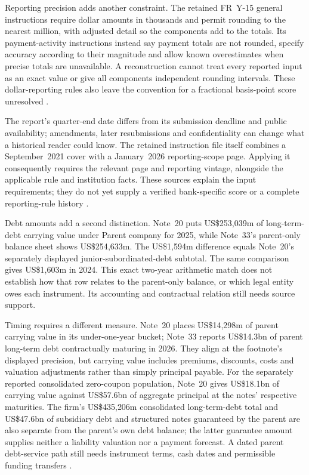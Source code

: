 Reporting precision adds another constraint. The retained FR~Y-15 general
instructions require dollar amounts in thousands and permit rounding to the
nearest million, with adjusted detail so the components add to the totals.
Its payment-activity instructions instead say payment totals are not rounded,
specify accuracy according to their magnitude and allow known overestimates
when precise totals are unavailable. A reconstruction cannot treat every
reported input as an exact value or give all components independent rounding
intervals. These dollar-reporting rules also leave the convention for a
fractional basis-point score unresolved
\citep[GEN-3--4 and C-1; physical pp.~7--8, 25]{fry15instructionsretained2026}.

\begin{samepage}
The report's quarter-end date differs from its submission deadline and public
availability; amendments, later resubmissions and confidentiality can change
what a historical reader could know. The retained instruction file itself
combines a September~2021 cover with a January~2026 reporting-scope page.
Applying it consequently requires the relevant page and reporting vintage,
alongside the applicable rule and institution facts. These sources explain
the input requirements; they do not yet supply a verified bank-specific score
or a complete reporting-rule history
\citep[cover and GEN-1--5; physical pp.~1, 5--9]{fry15instructionsretained2026}.
\par
\end{samepage}


Debt amounts add a second distinction. Note~20 puts US\$253{,}039m of
long-term-debt carrying value under Parent company for 2025, while Note~33's
parent-only balance sheet shows US\$254{,}633m. The US\$1{,}594m difference
equals Note~20's separately displayed junior-subordinated-debt subtotal. The
same comparison gives US\$1{,}603m in 2024. This exact two-year arithmetic
match does not establish how that row relates to the parent-only balance,
or which legal entity owes each instrument. Its accounting and
contractual relation still needs source support.

Timing requires a different measure. Note~20 places US\$14{,}298m of parent
carrying value in its under-one-year bucket; Note~33 reports US\$14.3bn of
parent long-term debt contractually maturing in 2026. They align at the
footnote's displayed precision, but carrying value includes premiums,
discounts, costs and valuation adjustments rather than simply principal
payable. For the separately reported consolidated zero-coupon population,
Note~20 gives US\$18.1bn of carrying value against US\$57.6bn of aggregate
principal at the notes' respective maturities. The firm's US\$435{,}206m
consolidated long-term-debt total and US\$47.6bn of subsidiary debt and
structured notes guaranteed by the parent are also separate from the parent's
own debt balance; the latter guarantee amount supplies neither a liability
valuation nor a payment forecast. A dated parent debt-service path still needs
instrument terms, cash dates and permissible funding transfers
\citep[pp.~281--282, 310--311]{jpmorgan2025tenk}.

